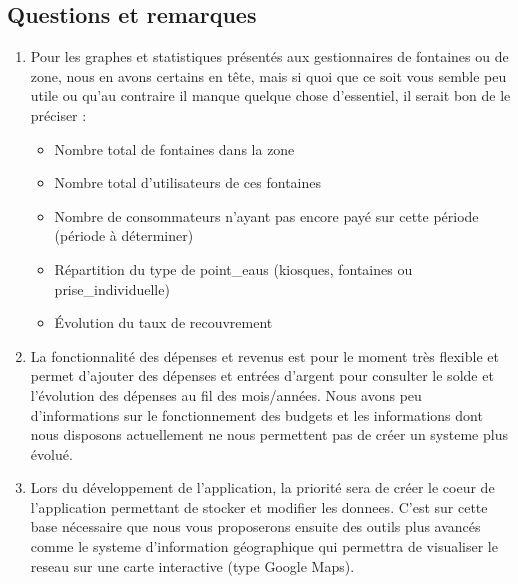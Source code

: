 \documentclass[a4paper, 11pt]{article}
\begin{document}
\begin{mdframed}[style=HighlightQuestion]
    \subsection{Questions et remarques}
    \begin{enumerate}
      \item Pour les graphes et statistiques présentés aux gestionnaires de \glspl{fontaine} ou de \gls{zone}, nous en avons certains en tête, mais si quoi que ce soit vous semble peu utile ou qu'au contraire il manque quelque chose d'essentiel, il serait bon de le préciser :
      \begin{itemize}
        \item Nombre total de \glspl{fontaine} dans la \gls{zone}
        \item Nombre total d'\glspl{utilisateur} de ces \glspl{fontaine}
        \item Nombre de \glspl{consommateur} n'ayant pas encore payé sur cette période (période à déterminer)
        \item Répartition du type de \glspl{point_eau} (kiosques, \glspl{fontaine} ou \gls{prise_individuelle})
        \item Évolution du taux de recouvrement
      \end{itemize}
      \item La fonctionnalité des dépenses et revenus est pour le moment très flexible et permet d'ajouter des dépenses et entrées d'argent pour consulter le solde et l'évolution des dépenses au fil des mois/années. Nous avons peu d'informations sur le fonctionnement des budgets et les informations dont nous disposons actuellement ne nous permettent pas de créer un \gls{systeme} plus évolué.
      \item Lors du développement de l'\gls{application}, la priorité sera de créer le coeur de l'\gls{application} permettant de stocker et modifier les \glspl{donnee}. C'est sur cette base nécessaire que nous vous proposerons ensuite des outils plus avancés comme le \gls{systeme} d'information géographique qui permettra de visualiser le \gls{reseau} sur une carte interactive (type Google Maps).

\end{enumerate}
\end{mdframed}
\end{document}
